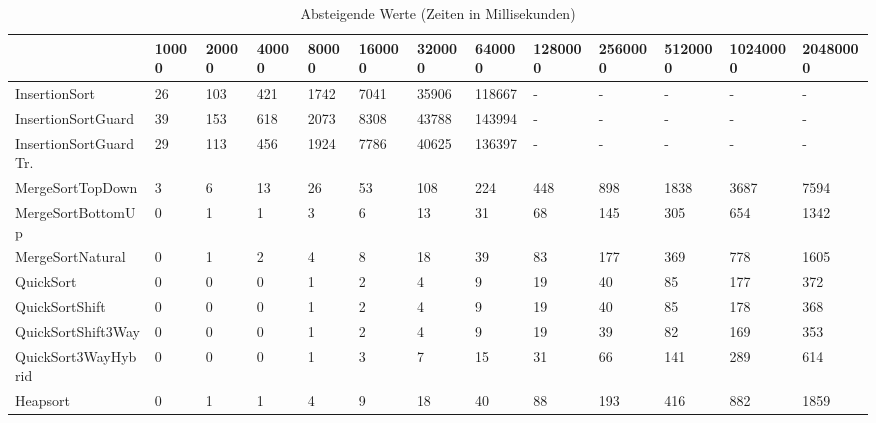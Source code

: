 \begin{table}[h]
\begin{tabular}{|l|l|l|l|l|l|l|l|l|l|l|l|l|}
\hline
 & 10000 & 20000 & 40000 & 80000 & 160000 & 320000 & 640000 & 1280000 & 2560000 & 5120000 & 10240000 & 20480000 \\ \hline
InsertionSort & 26 & 103 & 421 & 1742 & 7041 & 35906 & 118667 & - & - & - & - & - \\ \hline
InsertionSortGuard & 39 & 153 & 618 & 2073 & 8308 & 43788 & 143994 & - & - & - & - & - \\ \hline
InsertionSortGuardTr. & 29 & 113 & 456 & 1924 & 7786 & 40625 & 136397 & - & - & - & - & - \\ \hline
MergeSortTopDown & 3 & 6 & 13 & 26 & 53 & 108 & 224 & 448 & 898 & 1838 & 3687 & 7594 \\ \hline
MergeSortBottomUp & 0 & 1 & 1 & 3 & 6 & 13 & 31 & 68 & 145 & 305 & 654 & 1342 \\ \hline
MergeSortNatural & 0 & 1 & 2 & 4 & 8 & 18 & 39 & 83 & 177 & 369 & 778 & 1605 \\ \hline
QuickSort & 0 & 0 & 0 & 1 & 2 & 4 & 9 & 19 & 40 & 85 & 177 & 372 \\ \hline
QuickSortShift & 0 & 0 & 0 & 1 & 2 & 4 & 9 & 19 & 40 & 85 & 178 & 368 \\ \hline
QuickSortShift3Way & 0 & 0 & 0 & 1 & 2 & 4 & 9 & 19 & 39 & 82 & 169 & 353 \\ \hline
QuickSort3WayHybrid & 0 & 0 & 0 & 1 & 3 & 7 & 15 & 31 & 66 & 141 & 289 & 614 \\ \hline
Heapsort & 0 & 1 & 1 & 4 & 9 & 18 & 40 & 88 & 193 & 416 & 882 & 1859 \\ \hline
\end{tabular}
\caption{Absteigende Werte (Zeiten in Millisekunden)}
\end{table}
